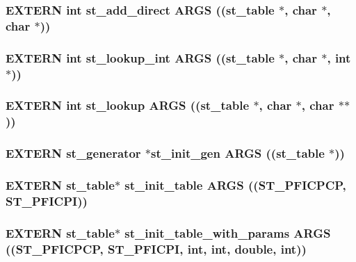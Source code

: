 \subsubsection{\setlength{\rightskip}{0pt plus 5cm}EXTERN int st\_\-add\_\-direct ARGS ((\bf{st\_\-table} $\ast$, char $\ast$, char $\ast$))}\label{st_8h_0c7f9e859df432707342beed9e993a87}


\subsubsection{\setlength{\rightskip}{0pt plus 5cm}EXTERN int st\_\-lookup\_\-int ARGS ((\bf{st\_\-table} $\ast$, char $\ast$, int $\ast$))}\label{st_8h_4e3972bf4d28640fc57d222aca2c62c2}


\subsubsection{\setlength{\rightskip}{0pt plus 5cm}EXTERN int st\_\-lookup ARGS ((\bf{st\_\-table} $\ast$, char $\ast$, char $\ast$$\ast$))}\label{st_8h_c2cf0a2febab8fd175bf02cadebebd39}


\subsubsection{\setlength{\rightskip}{0pt plus 5cm}EXTERN \bf{st\_\-generator} $\ast$st\_\-init\_\-gen ARGS ((\bf{st\_\-table} $\ast$))}\label{st_8h_d8e8c7a2d697f7e78329a947661c5287}


\subsubsection{\setlength{\rightskip}{0pt plus 5cm}EXTERN \bf{st\_\-table}$\ast$ st\_\-init\_\-table ARGS ((\bf{ST\_\-PFICPCP}, \bf{ST\_\-PFICPI}))}\label{st_8h_0f0684f6d509dda64ccc84f00aa28077}


\subsubsection{\setlength{\rightskip}{0pt plus 5cm}EXTERN \bf{st\_\-table}$\ast$ st\_\-init\_\-table\_\-with\_\-params ARGS ((\bf{ST\_\-PFICPCP}, \bf{ST\_\-PFICPI}, int, int, double, int))}\label{st_8h_8c6000f29ffca39810c91109fea38b8d}




